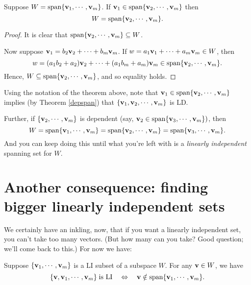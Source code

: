 \begin{theorem}\label{redspan}
 Suppose $W= \textrm{span}\{ \mathbf{v}_1, \cdots, \mathbf{v}_m\}$.\hfill\break
If $\mathbf{v}_1 \in \textrm{span}\{\mathbf{v}_2, \cdots, \mathbf{v}_m\}$ then
$$
W = \textrm{span}\{ \mathbf{v}_2, \cdots, \mathbf{v}_m\}.
$$
\end{theorem}
\begin{proof} It is clear that $\textrm{span}\{ \mathbf{v}_2, \cdots, \mathbf{v}_m\} \subseteq W$. 

Now suppose $ \mathbf{v}_1=b_2 \mathbf{v}_2 +\cdots +b_m\mathbf{v}_m$. If $w=a_1\mathbf{v}_1 +\cdots +a_m\mathbf{v}_m \in W$, then $$w =(a_1b_2 +a_2)\mathbf{v}_2 +\cdots + (a_1b_m +a_m)\mathbf{v}_m \in \textrm{span}\{ \mathbf{v}_2, \cdots, \mathbf{v}_m\}. $$
Hence, $
W \subseteq \textrm{span}\{ \mathbf{v}_2, \cdots, \mathbf{v}_m\}
$, and so equality holds.
\end{proof}

Using the notation of the theorem above, note that $\mathbf{v}_1 \in \textrm{span}\{\mathbf{v}_2, \cdots, \mathbf{v}_m\}$  implies (by Theorem \ref{depspan}) that $\{\mathbf{v}_1,\mathbf{v}_2, \cdots, \mathbf{v}_m\}$ is LD.
 

Further, if $\{ \mathbf{v}_2, \cdots, \mathbf{v}_m\}
$ is dependent (say, $\mathbf{v}_2 \in \textrm{span}\{\mathbf{v}_3, \cdots, \mathbf{v}_m\})$, then $$W=\textrm{span}\{ \mathbf{v}_1, \cdots, \mathbf{v}_m\}=\textrm{span}\{ \mathbf{v}_2, \cdots, \mathbf{v}_m\}=\textrm{span}\{ \mathbf{v}_3, \cdots, \mathbf{v}_m\}.$$
And you can keep doing this until what you're left with is a \emph{linearly 
independent} spanning set for $W$.

\section{Another consequence:  finding bigger linearly independent sets}

We certainly have an inkling, now, that if you want a linearly
independent set, you can't take too many vectors.  (But how many
can you take?  Good question; we'll come back to this.)
For now we have:

\begin{theorem}  \label{EnlargingLI}
Suppose  $\{\mathbf{v}_1, \cdots, \mathbf{v}_m\}$ is a LI subset of a subspace $W$.
For any $\mathbf{v} \in W$, we have
$$
\{\mathbf{v}, \mathbf{v}_1, \cdots, \mathbf{v}_m\} \; \textrm{is LI} \quad \Leftrightarrow \quad
\mathbf{v} \notin \textrm{span}\{\mathbf{v}_1, \cdots, \mathbf{v}_m\}.
$$
\end{theorem}

